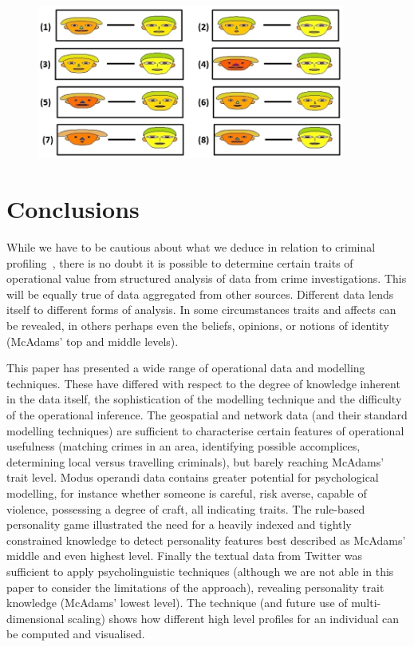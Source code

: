 \documentclass{llncs}
\begin{document}
\begin{figure}[!ht]
\centering
  \includegraphics[width=0.9\textwidth]{images/PairsOfBehaviour.jpg}
  \label{fig:pairsofbehav}
\end{figure}


\section{Conclusions}
While we have to be cautious about what we deduce in relation to
criminal profiling~\cite{alison-et-al:2002,snook-et-al:2008}, there is
no doubt it is possible to determine certain traits of operational
value from structured analysis of data from crime investigations. This
will be equally true of data aggregated from other sources. Different
data lends itself to different forms of analysis. In some
circumstances traits and affects can be revealed, in others perhaps
even the beliefs, opinions, or notions of identity (McAdams' top and
middle levels).

This paper has presented a wide range of operational data and
modelling techniques.  These have differed with respect to the degree
of knowledge inherent in the data itself, the sophistication of the
modelling technique and the difficulty of the operational inference.
The geospatial and network data (and their standard modelling
techniques) are sufficient to characterise certain features of
operational usefulness (matching crimes in an area, identifying
possible accomplices, determining local versus travelling criminals),
but barely reaching McAdams' trait level.  Modus operandi data
contains greater potential for psychological modelling, for instance
whether someone is careful, risk averse, capable of violence,
possessing a degree of craft, all indicating traits.  The rule-based
personality game illustrated the need for a heavily indexed and
tightly constrained knowledge to detect personality features best
described as McAdams' middle and even highest level.  Finally the
textual data from Twitter was sufficient to apply psycholinguistic
techniques (although we are not able in this paper to consider the
limitations of the approach), revealing personality trait knowledge
(McAdams' lowest level). The technique (and future use of
multi-dimensional scaling) shows how different high level profiles for
an individual can be computed and visualised.
 
\end{document}
